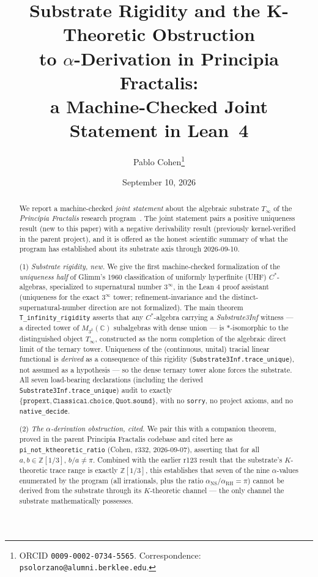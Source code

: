 \documentclass[11pt,a4paper]{article}
\title{Substrate Rigidity and the K-Theoretic Obstruction\\ to $\alpha$-Derivation in Principia Fractalis:\\ a Machine-Checked Joint Statement in Lean~4}
\author[1]{Pablo Cohen\thanks{ORCID \texttt{0009-0002-0734-5565}. Correspondence: \texttt{psolorzano@alumni.berklee.edu}.}}
\affil[1]{FractalDevTeam \& Principia Fractalis Research Program}
\date{September 10, 2026}
\theoremstyle{plain}
\theoremstyle{definition}
\begin{document}
\maketitle

\begin{abstract}
We report a machine-checked \emph{joint statement} about the algebraic substrate $T_{\infty}$ of the \emph{Principia Fractalis} research program~\cite{cohen_pf_2026}. The joint statement pairs a positive uniqueness result (new to this paper) with a negative derivability result (previously kernel-verified in the parent project), and it is offered as the honest scientific summary of what the program has established about its substrate axis through 2026-09-10.

(1) \emph{Substrate rigidity, new.} We give the first machine-checked formalization of the \emph{uniqueness half} of Glimm's 1960 classification of uniformly hyperfinite (UHF) $C^{\ast}$-algebras, specialized to supernatural number $3^{\infty}$, in the Lean 4 proof assistant (uniqueness for the exact $3^{\infty}$ tower; refinement-invariance and the distinct-supernatural-number direction are not formalized). The main theorem \texttt{T\_infinity\_rigidity} asserts that any $C^{\ast}$-algebra carrying a \emph{Substrate3Inf} witness --- a directed tower of $M_{3^k}(\mathbb{C})$ subalgebras with dense union --- is $\ast$-isomorphic to the distinguished object $T_{\infty}$, constructed as the norm completion of the algebraic direct limit of the ternary tower. Uniqueness of the (continuous, unital) tracial linear functional is \emph{derived} as a consequence of this rigidity (\texttt{Substrate3Inf.trace\_unique}), not assumed as a hypothesis --- so the dense ternary tower alone forces the substrate. All seven load-bearing declarations (including the derived \texttt{Substrate3Inf.trace\_unique}) audit to exactly $\{\texttt{propext}, \texttt{Classical.choice}, \texttt{Quot.sound}\}$, with no \texttt{sorry}, no project axioms, and no \texttt{native\_decide}.

(2) \emph{The $\alpha$-derivation obstruction, cited.} We pair this with a companion theorem, proved in the parent Principia Fractalis codebase and cited here as \texttt{pi\_not\_ktheoretic\_ratio} (Cohen, r332, 2026-09-07), asserting that for all $a, b \in \mathbb{Z}[1/3]$, $b/a \neq \pi$. Combined with the earlier r123 result that the substrate's $K$-theoretic trace range is exactly $\mathbb{Z}[1/3]$, this establishes that seven of the nine $\alpha$-values enumerated by the program (all irrationals, plus the ratio $\alpha_{\mathrm{NS}}/\alpha_{\mathrm{RH}} = \pi$) cannot be derived from the substrate through its $K$-theoretic channel --- the only channel the substrate mathematically possesses.


\end{abstract}
\end{document}
